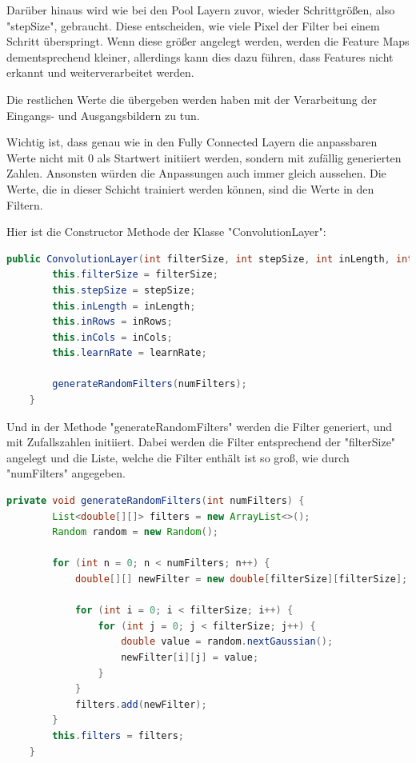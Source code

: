 \documentclass[12pt]{article}
\begin{document}
Darüber hinaus wird wie bei den Pool Layern zuvor, wieder Schrittgrößen, also "stepSize", gebraucht. Diese entscheiden, wie viele Pixel der Filter bei einem Schritt überspringt. Wenn diese größer angelegt werden, werden die Feature Maps dementsprechend kleiner, allerdings kann dies dazu führen, dass Features nicht erkannt und weiterverarbeitet werden. 

Die restlichen Werte die übergeben werden haben mit der Verarbeitung der Eingangs- und Ausgangsbildern zu tun.

Wichtig ist, dass genau wie in den Fully Connected Layern die anpassbaren Werte nicht mit 0 als Startwert initiiert werden, sondern mit zufällig generierten Zahlen. Ansonsten würden die Anpassungen auch immer gleich aussehen. Die Werte, die in dieser Schicht trainiert werden können, sind die Werte in den Filtern.

Hier ist die Constructor Methode der Klasse "ConvolutionLayer":

\begin{lstlisting}[language=Java]
public ConvolutionLayer(int filterSize, int stepSize, int inLength, int inRows, int inCols, int numFilters, double learnRate) {
        this.filterSize = filterSize;
        this.stepSize = stepSize;
        this.inLength = inLength;
        this.inRows = inRows;
        this.inCols = inCols;
        this.learnRate = learnRate;

        generateRandomFilters(numFilters);
    }
\end{lstlisting}

Und in der Methode "generateRandomFilters" werden die Filter generiert, und mit Zufallszahlen initiiert. Dabei werden die Filter entsprechend der "filterSize" angelegt und die Liste, welche die Filter enthält ist so groß, wie durch "numFilters" angegeben.

\begin{lstlisting}[language=Java]
private void generateRandomFilters(int numFilters) {
        List<double[][]> filters = new ArrayList<>();
        Random random = new Random();

        for (int n = 0; n < numFilters; n++) {
            double[][] newFilter = new double[filterSize][filterSize];

            for (int i = 0; i < filterSize; i++) {
                for (int j = 0; j < filterSize; j++) {
                    double value = random.nextGaussian();
                    newFilter[i][j] = value;
                }
            }
            filters.add(newFilter);
        }
        this.filters = filters;
    }
\end{lstlisting}
\end{document}
